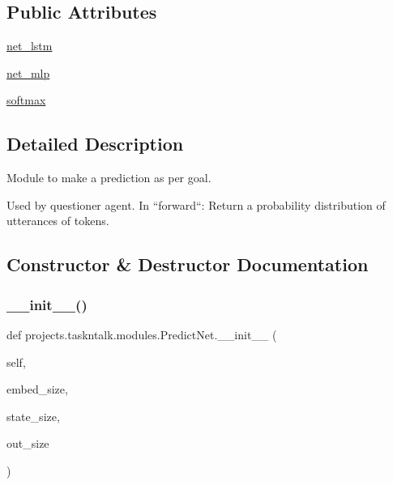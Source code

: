 \subsection*{Public Attributes}
\begin{DoxyCompactItemize}
\item 
\hyperlink{classprojects_1_1taskntalk_1_1modules_1_1PredictNet_ad1120f3386bd6612376876ba51804285}{net\+\_\+lstm}
\item 
\hyperlink{classprojects_1_1taskntalk_1_1modules_1_1PredictNet_ac4f309ddfe1d817c3d345f390604322e}{net\+\_\+mlp}
\item 
\hyperlink{classprojects_1_1taskntalk_1_1modules_1_1PredictNet_ade00e095f7c5b6a29284e514d7aaaf44}{softmax}
\end{DoxyCompactItemize}


\subsection{Detailed Description}
\begin{DoxyVerb}Module to make a prediction as per goal.

Used by questioner agent. In
``forward``: Return a probability distribution of utterances of tokens.
\end{DoxyVerb}
 

\subsection{Constructor \& Destructor Documentation}
\mbox{\label{classprojects_1_1taskntalk_1_1modules_1_1PredictNet_a5b052209d94ae50776738fbecb54f304}} 
\subsubsection{\texorpdfstring{\+\_\+\+\_\+init\+\_\+\+\_\+()}{\_\_init\_\_()}}
{\footnotesize\ttfamily def projects.\+taskntalk.\+modules.\+Predict\+Net.\+\_\+\+\_\+init\+\_\+\+\_\+ (\begin{DoxyParamCaption}\item[{}]{self,  }\item[{}]{embed\+\_\+size,  }\item[{}]{state\+\_\+size,  }\item[{}]{out\+\_\+size }\end{DoxyParamCaption})}



